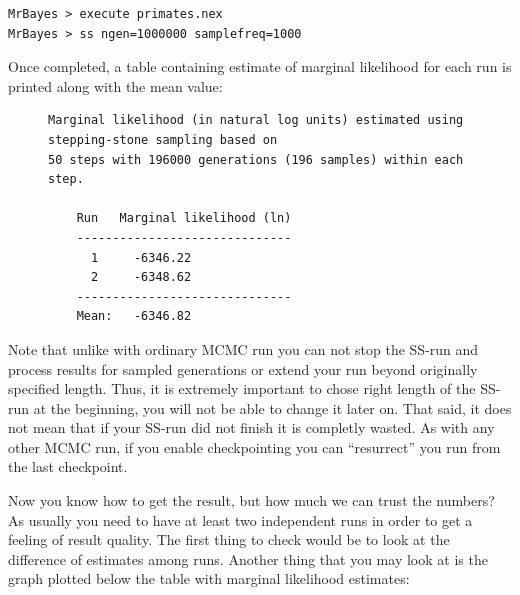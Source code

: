 \documentclass[12pt]{book}
\begin{document}
\begin{Verbatim}
MrBayes > execute primates.nex
MrBayes > ss ngen=1000000 samplefreq=1000
\end{Verbatim}

Once completed, a table containing estimate of marginal likelihood for each run is printed along
with the mean value:

\begin{figure}[h]
\centering
\begin{BVerbatim}
Marginal likelihood (in natural log units) estimated using stepping-stone sampling based on
50 steps with 196000 generations (196 samples) within each step.

    Run   Marginal likelihood (ln)
    ------------------------------
      1     -6346.22
      2     -6348.62
    ------------------------------
    Mean:   -6346.82
\end{BVerbatim}
\end{figure}

Note that unlike with ordinary MCMC run you can not stop the SS-run and process results for sampled
generations or extend your run beyond originally specified length. Thus, it is extremely important
to chose right length of the SS-run at the beginning, you will not be able to change it later on.
That said, it does not mean that if your SS-run did not finish it is completly wasted. As with any
other MCMC run, if you enable checkpointing you can ``resurrect'' you run from the last checkpoint.

Now you know how to get the result, but how much we can trust the numbers? As usually you need to
have at least two independent runs in order to get a feeling of result quality. The first thing to
check would be to look at the difference of estimates among runs. Another thing that you may look
at is the graph plotted below the table with marginal likelihood estimates:
\end{document}
